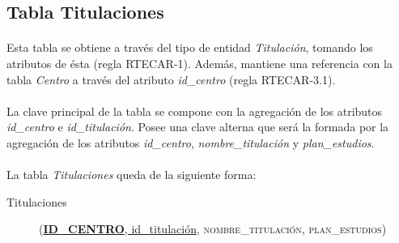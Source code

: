    \subsection{Tabla Titulaciones}

      \paragraph{}Esta tabla se obtiene a través del tipo de entidad
      \textit{Titulación}, tomando los atributos de ésta (regla RTECAR-1).
      Además, mantiene una referencia con la tabla \textit{Centro} a través
      del atributo \textit{id\_centro} (regla RTECAR-3.1).

      \paragraph{}La clave principal de la tabla se compone con la agregación de
      los atributos \textit{id\_centro} e \textit{id\_titulación}. Posee una
      clave alterna que será la formada por la agregación de los atributos
      \textit{id\_centro}, \textit{nombre\_titulación} y
      \textit{plan\_estudios}.

      \paragraph{}La tabla \textit{Titulaciones} queda de la siguiente forma:

      \begin{description}
         \item[Titulaciones] \begin{flushleft}(\underline{\textbf{ID\_CENTRO},
         id\_titulación}, \textsc{nombre\_titulación},
         \textsc{plan\_estudios})\end{flushleft}
      \end{description}
